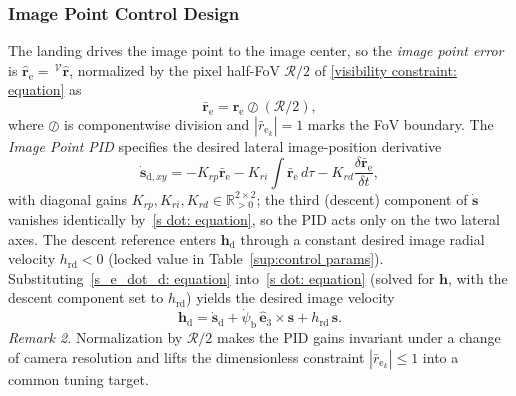 \documentclass{IEEEtaes}
\begin{document}
\subsubsection{Image Point Control Design} \label{image point control: section}
The landing drives the image point to the image center, so the \emph{image point error} is $\hat{\boldsymbol{r}}_\text{e}=\,^\mathcal{V}\hat{\boldsymbol{r}}$, normalized by the pixel half-FoV $\mathcal{R}/2$ of \eqref{visibility constraint: equation} as
\begin{equation} \label{normalized error: equation}
    \bar{\boldsymbol{r}}_\text{e} = \hat{\boldsymbol{r}}_\text{e}\oslash(\mathcal{R}/2),
\end{equation}
where $\oslash$ is componentwise division and $|\bar{r}_{\text{e}_k}|=1$ marks the FoV boundary. The \emph{Image Point PID} specifies the desired lateral image-position derivative
\begin{equation} \label{s_e_dot_d: equation}
    \dot{\boldsymbol{s}}_{\text{d},xy} = -K_{rp}\bar{\boldsymbol{r}}_\text{e} - K_{ri}\!\int\bar{\boldsymbol{r}}_\text{e}\,d\tau - K_{rd}\frac{\delta\bar{\boldsymbol{r}}_\text{e}}{\delta t},
\end{equation}
with diagonal gains $K_{rp},K_{ri},K_{rd}\in\mathbb{R}^{2\times 2}_{>0}$; the third (descent) component of $\dot{\boldsymbol{s}}$ vanishes identically by~\eqref{s dot: equation}, so the PID acts only on the two lateral axes. The descent reference enters $\boldsymbol{h}_\text{d}$ through a constant desired image radial velocity $h_\text{rd}<0$ (locked value in Table~\ref{sup:control params}). Substituting~\eqref{s_e_dot_d: equation} into~\eqref{s dot: equation} (solved for $\boldsymbol{h}$, with the descent component set to $h_\text{rd}$) yields the desired image velocity
\begin{equation} \label{h_d final: equation}
    \boldsymbol{h}_\text{d} = \dot{\boldsymbol{s}}_\text{d} + \dot{\psi}_\text{b}\,\hat{\boldsymbol{e}}_3\times\boldsymbol{s} + h_\text{rd}\,\boldsymbol{s}.
\end{equation}
\textit{Remark 2.} Normalization by $\mathcal{R}/2$ makes the PID gains invariant under a change of camera resolution and lifts the dimensionless constraint $|\bar{r}_{\text{e}_k}|\le 1$ into a common tuning target.
\end{document}
